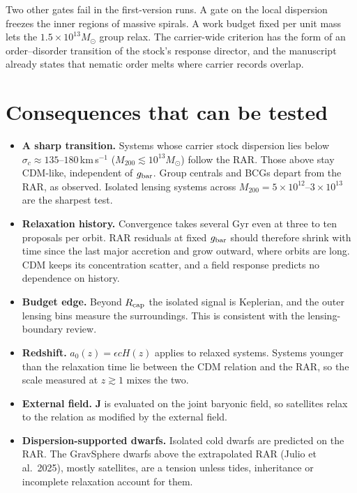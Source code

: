 Two other gates fail in the first-version runs. A gate on the local dispersion freezes the inner regions of massive spirals. A work budget fixed per unit mass lets the $1.5\times10^{13}M_\odot$ group relax. The carrier-wide criterion has the form of an order--disorder transition of the stock's response director, and the manuscript already states that nematic order melts where carrier records overlap.

\section{Consequences that can be tested}
\begin{itemize}
\item \textbf{A sharp transition.} Systems whose carrier stock dispersion lies below $\sigma_c\approx135$--$180$\,km\,s$^{-1}$ ($M_{200}\lesssim10^{13}M_\odot$) follow the RAR. Those above stay CDM-like, independent of $g_{\rm bar}$. Group centrals and BCGs depart from the RAR, as observed. Isolated lensing systems across $M_{200}=5\times10^{12}$--$3\times10^{13}$ are the sharpest test.
\item \textbf{Relaxation history.} Convergence takes several Gyr even at three to ten proposals per orbit. RAR residuals at fixed $g_{\rm bar}$ should therefore shrink with time since the last major accretion and grow outward, where orbits are long. CDM keeps its concentration scatter, and a field response predicts no dependence on history.
\item \textbf{Budget edge.} Beyond $R_{\rm cap}$ the isolated signal is Keplerian, and the outer lensing bins measure the surroundings. This is consistent with the lensing-boundary review.
\item \textbf{Redshift.} $a_0(z)=\epsilon cH(z)$ applies to relaxed systems. Systems younger than the relaxation time lie between the CDM relation and the RAR, so the scale measured at $z\gtrsim1$ mixes the two.
\item \textbf{External field.} $\mathbf J$ is evaluated on the joint baryonic field, so satellites relax to the relation as modified by the external field.
\item \textbf{Dispersion-supported dwarfs.} Isolated cold dwarfs are predicted on the RAR. The GravSphere dwarfs above the extrapolated RAR (Julio et al.\ 2025), mostly satellites, are a tension unless tides, inheritance or incomplete relaxation account for them.
\end{itemize}

